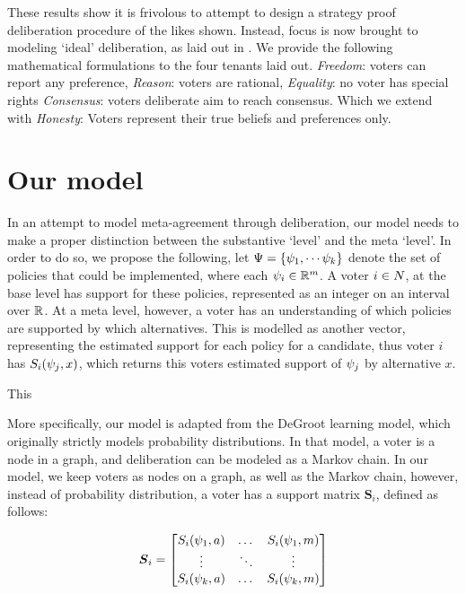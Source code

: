 These results show it is frivolous to attempt to design a strategy proof deliberation procedure of the likes shown. Instead, focus is now brought to modeling `ideal' deliberation, as laid out in . We provide the following mathematical formulations to the four tenants laid out. \emph{Freedom}: voters can report any preference, \emph{Reason}: voters are rational, \emph{Equality}: no voter has special rights \emph{Consensus}:  voters deliberate aim to reach consensus. Which we extend with \emph{Honesty}: Voters represent their true beliefs and preferences only.


\section{Our model}
\label{sec: main model}

In an attempt to model meta-agreement through deliberation, our model needs to make a proper distinction between the substantive `level' and the meta `level'. In order to do so, we propose the following, let \(\Psi = \{\psi_{1}, \cdots \psi_{k}\}\) denote the set of policies that could be implemented, where each $\psi_i \in \mathbb{R}^{m}$. A voter $i \in N$, at the base level has support for these policies, represented as an integer on an interval over $\mathbb{R}$. At a meta level, however, a voter has an understanding of which policies are supported by which alternatives. This is modelled as another vector, representing the estimated support for each policy for a candidate, thus voter $i$ has $S_i(\psi_j, x)$, which returns this voters estimated support of $\psi_j$ by alternative $x$.

This 

More specifically, our model is adapted from the DeGroot learning model, which originally strictly models probability distributions. In that model, a voter is a node in a graph, and deliberation can be modeled as a Markov chain. In our model, we keep voters as nodes on a graph, as well as the Markov chain, however, instead of probability distribution, a voter has a support matrix $\boldsymbol{S}_i$, defined as follows:

\[
	\boldsymbol{S}_i =\begin{bmatrix}
		S_i(\psi_1 , a) & \dots  & S_i(\psi_1 , m) \\
		\vdots       & \ddots & \vdots       \\
		S_i(\psi_k , a) & \dots  & S_i(\psi_k , m) \\
	\end{bmatrix}
\]

